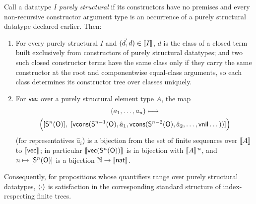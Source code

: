 \begin{proposition}
\label{prop:standard}
Call a datatype $I$ \emph{purely structural} if its constructors have no
premises and every non-recursive constructor argument type is an
occurrence of a purely structural datatype declared earlier.  Then:
\begin{enumerate}[leftmargin=2em]
\item For every purely structural $I$ and $(\vec{d}, d) \in [\![ I ]\!]_{}$,
  $d$ is the class of a closed term built exclusively from constructors
  of purely structural datatypes; and two such closed constructor terms
  have the same class only if they carry the same constructor at the
  root and componentwise equal-class arguments, so each class
  determines its constructor tree over classes uniquely.
\item For $\mathsf{vec}$ over a purely structural element type $A$, the map
  \begin{multline*}
    (a_1, \dots, a_n) \longmapsto\\
    \Bigl([\mathsf{S}^n(\mathsf{O})],\ [\mathsf{vcons}(\mathsf{S}^{n-1}(\mathsf{O}), \hat a_1,
    \mathsf{vcons}(\mathsf{S}^{n-2}(\mathsf{O}), \hat a_2, \dots, \mathsf{vnil} \dots))]\Bigr)
  \end{multline*}
  (for representatives $\hat a_i$) is a bijection from the set of finite
  sequences over $[\![ A ]\!]_{}$ to $[\![ \mathsf{vec} ]\!]_{}$; in particular
  $[\![ \mathsf{vec}(\mathsf{S}^n(\mathsf{O})) ]\!]_{}$ is in bijection with
  $[\![ A ]\!]_{}^{\,n}$, and $n \mapsto [\mathsf{S}^n(\mathsf{O})]$ is a bijection
  $\mathbb{N} \to [\![ \mathsf{nat} ]\!]_{}$.
\end{enumerate}
Consequently, for propositions whose quantifiers range over purely
structural datatypes, $\langle \cdot \rangle$ is satisfaction in the corresponding
standard structure of index-respecting finite trees.
\end{proposition}


